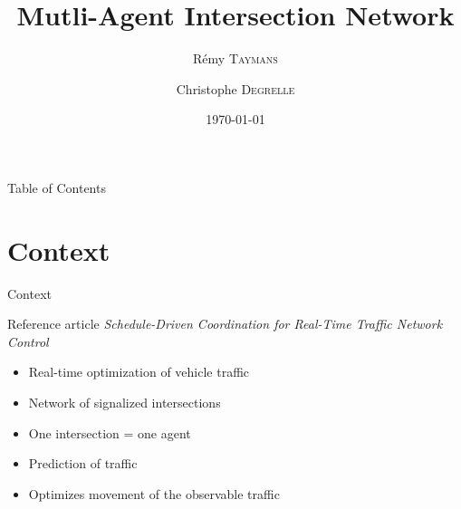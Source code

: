 \documentclass[]{beamer}
\author{Rémy \textsc{Taymans} \and Christophe \textsc{Degrelle}}
\title{Mutli-Agent Intersection Network}
\institute{ECAM}
\date{\today}
\begin{document}
\begin{frame}
  \titlepage
\end{frame}


\begin{frame}{Table of Contents}
  \tableofcontents
\end{frame}


\section{Context}
\begin{frame}{Context}
\begin{block}{Reference article}
\centering
\emph{Schedule-Driven Coordination for Real-Time Traffic Network Control}
\end{block}


 \begin{itemize}
  \item Real-time optimization of vehicle traffic
  \item Network of signalized intersections
  \item One intersection = one agent
  \item Prediction of traffic
  \item Optimizes movement of the observable traffic
 \end{itemize}
\end{frame}
\end{document}
